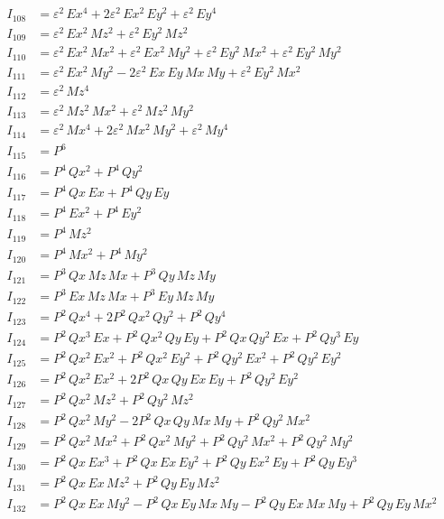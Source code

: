 \documentclass{article}
\begin{document}
\begin{align*}
I_{108} &= ε^{2}\,Ex^{4} + 2ε^{2}\,Ex^{2}\,Ey^{2} + ε^{2}\,Ey^{4} \\
I_{109} &= ε^{2}\,Ex^{2}\,Mz^{2} + ε^{2}\,Ey^{2}\,Mz^{2} \\
I_{110} &= ε^{2}\,Ex^{2}\,Mx^{2} + ε^{2}\,Ex^{2}\,My^{2} + ε^{2}\,Ey^{2}\,Mx^{2} + ε^{2}\,Ey^{2}\,My^{2} \\
I_{111} &= ε^{2}\,Ex^{2}\,My^{2} - 2ε^{2}\,Ex\,Ey\,Mx\,My + ε^{2}\,Ey^{2}\,Mx^{2} \\
I_{112} &= ε^{2}\,Mz^{4} \\
I_{113} &= ε^{2}\,Mz^{2}\,Mx^{2} + ε^{2}\,Mz^{2}\,My^{2} \\
I_{114} &= ε^{2}\,Mx^{4} + 2ε^{2}\,Mx^{2}\,My^{2} + ε^{2}\,My^{4} \\
I_{115} &= P^{6} \\
I_{116} &= P^{4}\,Qx^{2} + P^{4}\,Qy^{2} \\
I_{117} &= P^{4}\,Qx\,Ex + P^{4}\,Qy\,Ey \\
I_{118} &= P^{4}\,Ex^{2} + P^{4}\,Ey^{2} \\
I_{119} &= P^{4}\,Mz^{2} \\
I_{120} &= P^{4}\,Mx^{2} + P^{4}\,My^{2} \\
I_{121} &= P^{3}\,Qx\,Mz\,Mx + P^{3}\,Qy\,Mz\,My \\
I_{122} &= P^{3}\,Ex\,Mz\,Mx + P^{3}\,Ey\,Mz\,My \\
I_{123} &= P^{2}\,Qx^{4} + 2P^{2}\,Qx^{2}\,Qy^{2} + P^{2}\,Qy^{4} \\
I_{124} &= P^{2}\,Qx^{3}\,Ex + P^{2}\,Qx^{2}\,Qy\,Ey + P^{2}\,Qx\,Qy^{2}\,Ex + P^{2}\,Qy^{3}\,Ey \\
I_{125} &= P^{2}\,Qx^{2}\,Ex^{2} + P^{2}\,Qx^{2}\,Ey^{2} + P^{2}\,Qy^{2}\,Ex^{2} + P^{2}\,Qy^{2}\,Ey^{2} \\
I_{126} &= P^{2}\,Qx^{2}\,Ex^{2} + 2P^{2}\,Qx\,Qy\,Ex\,Ey + P^{2}\,Qy^{2}\,Ey^{2} \\
I_{127} &= P^{2}\,Qx^{2}\,Mz^{2} + P^{2}\,Qy^{2}\,Mz^{2} \\
I_{128} &= P^{2}\,Qx^{2}\,My^{2} - 2P^{2}\,Qx\,Qy\,Mx\,My + P^{2}\,Qy^{2}\,Mx^{2} \\
I_{129} &= P^{2}\,Qx^{2}\,Mx^{2} + P^{2}\,Qx^{2}\,My^{2} + P^{2}\,Qy^{2}\,Mx^{2} + P^{2}\,Qy^{2}\,My^{2} \\
I_{130} &= P^{2}\,Qx\,Ex^{3} + P^{2}\,Qx\,Ex\,Ey^{2} + P^{2}\,Qy\,Ex^{2}\,Ey + P^{2}\,Qy\,Ey^{3} \\
I_{131} &= P^{2}\,Qx\,Ex\,Mz^{2} + P^{2}\,Qy\,Ey\,Mz^{2} \\
I_{132} &= P^{2}\,Qx\,Ex\,My^{2} -P^{2}\,Qx\,Ey\,Mx\,My -P^{2}\,Qy\,Ex\,Mx\,My + P^{2}\,Qy\,Ey\,Mx^{2} \\

\end{align*}
\end{document}
